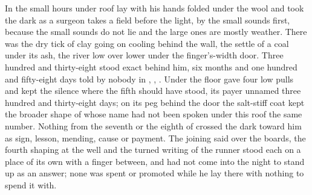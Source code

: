 
In the small hours under  roof  lay with his hands folded under the wool and took the dark as a surgeon takes a field before the light, by the small sounds first, because the small sounds do not lie and the large ones are mostly weather. There was the dry tick of clay going on cooling behind the wall, the settle of a coal under its ash, the river low over lower under the finger's-width door. Three hundred and thirty-eight stood exact behind him, six months and one hundred and fifty-eight days told by nobody in , , . Under the floor  gave four low pulls and kept the silence where the fifth should have stood, its payer unnamed three hundred and thirty-eight days; on its peg behind the door the salt-stiff coat kept the broader shape of  whose name had not been spoken under this roof the same number. Nothing from the seventh or the eighth of  crossed the dark toward him as sign, lesson, mending, cause or payment. The joining said over the boards, the fourth shaping at the well and the turned writing of the runner stood each on a place of its own with a finger between, and had not come into the night to stand up as an answer; none was spent or promoted while he lay there with nothing to spend it with.

